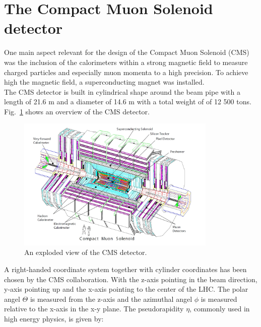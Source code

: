 \section{The Compact Muon Solenoid detector}
One main aspect relevant for the design of the Compact Muon Solenoid (CMS) was the inclusion of the calorimeters within a strong magnetic field to measure charged particles and especially muon momenta to a high precision. To achieve high the magnetic field, a superconducting magnet was installed.\\
The CMS detector is built in cylindrical shape around the beam pipe with a length of 21.6 m and a diameter of 14.6 m with a total weight of of 12 500 tons. Fig.~\ref{fig:CMS} shows an overview of the CMS detector.\\
\begin{figure}[tbhn]
\begin{center}
\includegraphics[width=0.85\textwidth]{detector/figures/CMS.jpg}
\end{center}
\caption{An exploded view of the CMS detector.}
\label{fig:CMS}
\end{figure}
\clearpage
A right-handed coordinate system together with cylinder coordinates has been chosen by the CMS collaboration.
With the z-axis pointing in the beam direction, y-axis pointing up and the x-axis pointing to the center of the LHC. The polar angel $\Theta$ is measured from the z-axis and the azimuthal angel $\phi$ is measured relative to the x-axis in the x-y plane.
The pseudorapidity $\eta$, commonly used in high energy physics, is given by:
